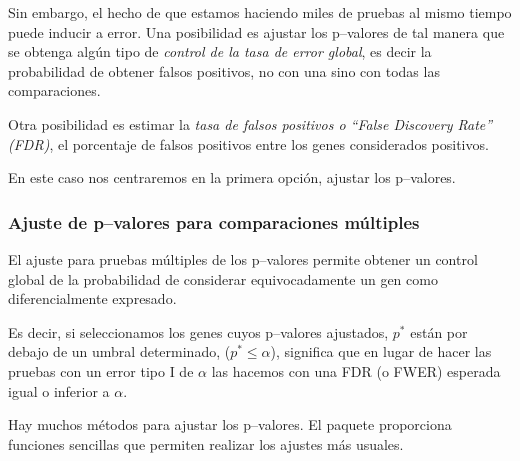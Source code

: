 \documentclass[a4paper]{article}\usepackage[]{graphicx}\usepackage[]{color}
\begin{document}
Sin embargo, el hecho de que estamos haciendo miles de pruebas al mismo tiempo puede inducir a error.
Una posibilidad es ajustar los p--valores de tal manera que se obtenga algún tipo
de \emph{control de la tasa de error global}, es decir la probabilidad de obtener falsos positivos, no con una sino con todas las comparaciones.

Otra posibilidad es estimar la \emph{tasa de falsos positivos o ``False Discovery Rate'' (FDR)}, el porcentaje de falsos positivos entre los genes considerados positivos.

En este caso nos centraremos en la primera opción, ajustar los p--valores.

\subsubsection{Ajuste de p--valores para comparaciones múltiples}

El ajuste para pruebas múltiples de los p--valores permite obtener un control global
de la probabilidad de considerar equivocadamente un gen como diferencialmente expresado.

Es decir, si seleccionamos los genes cuyos p--valores ajustados, $p^*$ están por debajo de un umbral determinado, ($p^* \leq \alpha$), significa que en lugar de hacer
las pruebas con un error tipo I de $\alpha$  las hacemos con una FDR (o FWER) esperada
igual o inferior a $\alpha $.

Hay muchos métodos para ajustar los p--valores. El paquete  proporciona funciones sencillas que permiten realizar los ajustes más usuales.
\end{document}
